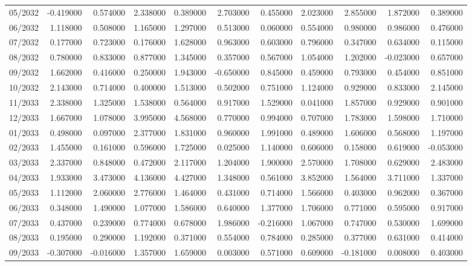\begin{tabular}{lrrrrrrrrrr}
05/2032 & -0.419000 & 0.574000 & 2.338000 & 0.389000 & 2.703000 & 0.455000 & 2.023000 & 2.855000 & 1.872000 & 0.389000 \\
06/2032 & 1.118000 & 0.508000 & 1.165000 & 1.297000 & 0.513000 & 0.060000 & 0.554000 & 0.980000 & 0.986000 & 0.476000 \\
07/2032 & 0.177000 & 0.723000 & 0.176000 & 1.628000 & 0.963000 & 0.603000 & 0.796000 & 0.347000 & 0.634000 & 0.115000 \\
08/2032 & 0.780000 & 0.833000 & 0.877000 & 1.345000 & 0.357000 & 0.567000 & 1.054000 & 1.202000 & -0.023000 & 0.657000 \\
09/2032 & 1.662000 & 0.416000 & 0.250000 & 1.943000 & -0.650000 & 0.845000 & 0.459000 & 0.793000 & 0.454000 & 0.851000 \\
10/2032 & 2.143000 & 0.714000 & 0.400000 & 1.513000 & 0.502000 & 0.751000 & 1.124000 & 0.929000 & 0.833000 & 2.145000 \\
11/2033 & 2.338000 & 1.325000 & 1.538000 & 0.564000 & 0.917000 & 1.529000 & 0.041000 & 1.857000 & 0.929000 & 0.901000 \\
12/2033 & 1.667000 & 1.078000 & 3.995000 & 4.568000 & 0.770000 & 0.994000 & 0.707000 & 1.783000 & 1.598000 & 1.710000 \\
01/2033 & 0.498000 & 0.097000 & 2.377000 & 1.831000 & 0.960000 & 1.991000 & 0.489000 & 1.606000 & 0.568000 & 1.197000 \\
02/2033 & 1.455000 & 0.161000 & 0.596000 & 1.725000 & 0.025000 & 1.140000 & 0.606000 & 0.158000 & 0.619000 & -0.053000 \\
03/2033 & 2.337000 & 0.848000 & 0.472000 & 2.117000 & 1.204000 & 1.900000 & 2.570000 & 1.708000 & 0.629000 & 2.483000 \\
04/2033 & 1.933000 & 3.473000 & 4.136000 & 4.427000 & 1.348000 & 0.561000 & 3.852000 & 1.564000 & 3.711000 & 1.337000 \\
05/2033 & 1.112000 & 2.060000 & 2.776000 & 1.464000 & 0.431000 & 0.714000 & 1.566000 & 0.403000 & 0.962000 & 0.367000 \\
06/2033 & 0.348000 & 1.490000 & 1.077000 & 1.586000 & 0.640000 & 1.377000 & 1.706000 & 0.771000 & 0.595000 & 0.917000 \\
07/2033 & 0.437000 & 0.239000 & 0.774000 & 0.678000 & 1.986000 & -0.216000 & 1.067000 & 0.747000 & 0.530000 & 1.699000 \\
08/2033 & 0.195000 & 0.290000 & 1.192000 & 0.371000 & 0.554000 & 0.784000 & 0.285000 & 0.377000 & 0.631000 & 0.414000 \\
09/2033 & -0.307000 & -0.016000 & 1.357000 & 1.659000 & 0.003000 & 0.571000 & 0.609000 & -0.181000 & 0.008000 & 0.403000 \\

\end{tabular}
